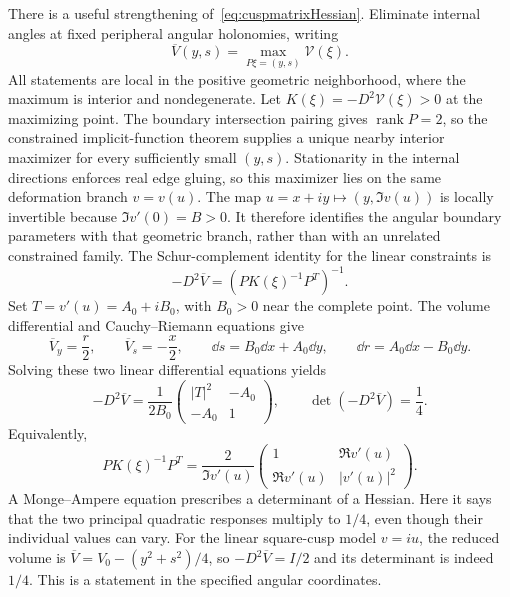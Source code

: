 There is a useful strengthening of~\eqref{eq:cuspmatrixHessian}.
Eliminate internal angles at fixed peripheral angular holonomies,
writing
\[
 \overline V(y,s)=\max_{P\xi=(y,s)}\mathscr V(\xi).
\]
All statements are local in the positive geometric neighborhood,
where the maximum is interior and nondegenerate. Let
$K(\xi)=-D^2\mathscr V(\xi)>0$ at the maximizing point.
The boundary intersection pairing gives $\operatorname{rank}P=2$,
so the constrained implicit-function theorem supplies a unique nearby
interior maximizer for every sufficiently small $(y,s)$.
Stationarity in the internal directions enforces real edge gluing,
so this maximizer lies on the same deformation branch $v=v(u)$.
The map $u=x+iy\mapsto(y,\Im v(u))$ is locally invertible because
$\Im v'(0)=B>0$. It therefore identifies the angular boundary
parameters with that geometric branch, rather than with an unrelated
constrained family.
The Schur-complement identity for the linear constraints is
\begin{equation}
 -D^2\overline V=(P K(\xi)^{-1}P^T)^{-1}.
 \label{eq:NZreducedHessian}
\end{equation}
Set $T=v'(u)=A_0+iB_0$, with $B_0>0$ near the complete point.
The volume differential and Cauchy--Riemann equations give
\[
 \overline V_y=\frac r2,\qquad
 \overline V_s=-\frac x2,\qquad
 \dd s=B_0\dd x+A_0\dd y,\qquad
 \dd r=A_0\dd x-B_0\dd y.
\]
Solving these two linear differential equations yields
\begin{equation}
 \boxed{-D^2\overline V
 =\frac1{2B_0}\begin{pmatrix}|T|^2&-A_0\\-A_0&1\end{pmatrix},
 \qquad \det(-D^2\overline V)=\frac14.}
 \label{eq:NZMongeAmpere}
\end{equation}
Equivalently,
\begin{equation}
 P K(\xi)^{-1}P^T
  =\frac2{\Im v'(u)}
       \begin{pmatrix}1&\Re v'(u)\\
                       \Re v'(u)&|v'(u)|^2\end{pmatrix}.
 \label{eq:NZnonlinearresponse}
\end{equation}
A Monge--Ampere equation prescribes a determinant of a Hessian.
Here it says that the two principal quadratic responses multiply
to $1/4$, even though their individual values can vary. For the
linear square-cusp model $v=iu$, the reduced volume is
$\overline V=V_0-(y^2+s^2)/4$, so
$-D^2\overline V=I/2$ and its determinant is indeed $1/4$.
This is a statement in the specified angular coordinates.

